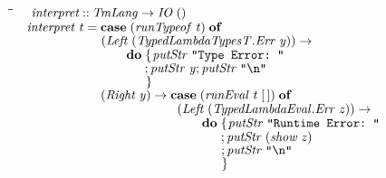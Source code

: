\documentclass[10pt]{article}
\newlength{\lwidth}\setlength{\lwidth}{4.5cm}
\newlength{\cwidth}\setlength{\cwidth}{8mm} %
\newcommand{\Conid}[1]{\mathit{#1}}
\newcommand{\Varid}[1]{\mathit{#1}}
\begin{document}
\begin{tabbing}
\qquad\=\hspace{\lwidth}\=\hspace{\cwidth}\=\+\kill
${\hskip1.00em\relax\Varid{interpret}\mathbin{::}\Conid{TmLang}\to \Conid{IO}\;()}$\\
${\hskip1.00em\relax\Varid{interpret}\;\Varid{t}\mathrel{=}\mathbf{case}\;(\Varid{runTypeof}\;\Varid{t})\;\mathbf{of}}$\\
${\hskip1.00em\relax\phantom{\Varid{interpret}\;\Varid{t}\mathrel{=}\mbox{}}(\Conid{Left}\;(\Conid{\Conid{TypedLambdaTypesT}.Err}\;\Varid{y}))\to }$\\
${\hskip1.00em\relax\phantom{\Varid{interpret}\;\Varid{t}\mathrel{=}\mbox{}}\hskip2.00em\relax\mathbf{do}\;\{\mskip1.5mu \Varid{putStr}\;\text{\tt \char34 Type~Error:~\char34}}$\\
${\hskip1.00em\relax\phantom{\Varid{interpret}\;\Varid{t}\mathrel{=}\mbox{}}\hskip2.00em\relax\phantom{\mathbf{do}\;\mbox{}};\Varid{putStr}\;\Varid{y};\Varid{putStr}\;\text{\tt \char34 \char92 n\char34}}$\\
${\hskip1.00em\relax\phantom{\Varid{interpret}\;\Varid{t}\mathrel{=}\mbox{}}\hskip2.00em\relax\phantom{\mathbf{do}\;\mbox{}}\mskip1.5mu\}}$\\
${\hskip1.00em\relax\phantom{\Varid{interpret}\;\Varid{t}\mathrel{=}\mbox{}}(\Conid{Right}\;\Varid{y})\to \mathbf{case}\;(\Varid{runEval}\;\Varid{t}\;[\mskip1.5mu \mskip1.5mu])\;\mathbf{of}}$\\
${\hskip1.00em\relax\phantom{\Varid{interpret}\;\Varid{t}\mathrel{=}\mbox{}}\hskip6.00em\relax(\Conid{Left}\;(\Conid{\Conid{TypedLambdaEval}.Err}\;\Varid{z}))\to }$\\
${\hskip1.00em\relax\phantom{\Varid{interpret}\;\Varid{t}\mathrel{=}\mbox{}}\hskip6.00em\relax\hskip2.00em\relax\mathbf{do}\;\{\mskip1.5mu \Varid{putStr}\;\text{\tt \char34 Runtime~Error:~\char34}}$\\
${\hskip1.00em\relax\phantom{\Varid{interpret}\;\Varid{t}\mathrel{=}\mbox{}}\hskip6.00em\relax\hskip2.00em\relax\phantom{\mathbf{do}\;\mbox{}};\Varid{putStr}\;(\Varid{show}\;\Varid{z})}$\\
${\hskip1.00em\relax\phantom{\Varid{interpret}\;\Varid{t}\mathrel{=}\mbox{}}\hskip6.00em\relax\hskip2.00em\relax\phantom{\mathbf{do}\;\mbox{}};\Varid{putStr}\;\text{\tt \char34 \char92 n\char34}}$\\
${\hskip1.00em\relax\phantom{\Varid{interpret}\;\Varid{t}\mathrel{=}\mbox{}}\hskip6.00em\relax\hskip2.00em\relax\phantom{\mathbf{do}\;\mbox{}}\mskip1.5mu\}}$\\

\end{tabbing}
\end{document}
